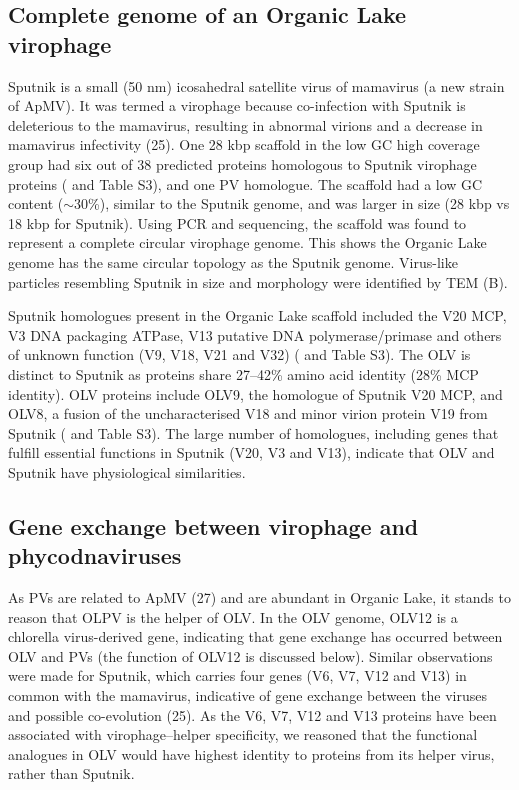 \subsection{Complete genome of an Organic Lake virophage}
Sputnik is a small (50 nm) icosahedral satellite virus of mamavirus (a new strain of \ac{ApMV}). 
It was termed a virophage because co-infection with Sputnik is deleterious to the mamavirus, resulting in abnormal virions and a decrease in mamavirus infectivity (25). 
One 28 kbp scaffold in the low GC high coverage group had six out of 38 predicted proteins homologous to Sputnik virophage proteins ( and Table S3), and one \ac{PV} homologue. 
The scaffold had a low GC content ($\sim$30\%), similar to the Sputnik genome, and was larger in size (28 kbp vs 18 kbp for Sputnik). 
Using \ac{PCR} and sequencing, the scaffold was found to represent a complete circular virophage genome.
This shows the Organic Lake genome has the same circular topology as the Sputnik genome. 
Virus-like particles resembling Sputnik in size and morphology were identified by \ac{TEM} (B).


Sputnik homologues present in the Organic Lake scaffold included the V20 \ac{MCP}, V3 \textsc{DNA} packaging \textsc{ATP}ase, V13 putative \textsc{DNA} polymerase/primase and others of unknown function (V9, V18, V21 and V32) ( and Table S3). 
The \ac{OLV} is distinct to Sputnik as proteins share 27--42\% amino acid identity (28\% \ac{MCP} identity). 
\ac{OLV} proteins include OLV9, the homologue of Sputnik V20 \ac{MCP}, and OLV8, a fusion of the uncharacterised V18 and minor virion protein V19 from Sputnik ( and Table S3). 
The large number of homologues, including genes that fulfill essential functions in Sputnik (V20, V3 and V13), indicate that \ac{OLV} and Sputnik have physiological similarities. 

\subsection{Gene exchange between virophage and phycodnaviruses}

As \acp{PV} are related to \ac{ApMV} (27) and are abundant in Organic Lake, it stands to reason that \ac{OLPV} is the helper of \ac{OLV}. 
In the \ac{OLV} genome, OLV12 is a chlorella virus-derived gene, indicating that gene exchange has occurred between \ac{OLV} and \acp{PV} (the function of OLV12 is discussed below). %
Similar observations were made for Sputnik, which carries four genes (V6, V7, V12 and V13) in common with the mamavirus, indicative of gene exchange between the viruses and possible co-evolution (25). 
As the V6, V7, V12 and V13 proteins have been associated with virophage--helper specificity, we reasoned that the functional analogues in \ac{OLV} would have highest identity to proteins from its helper virus, rather than Sputnik. 


